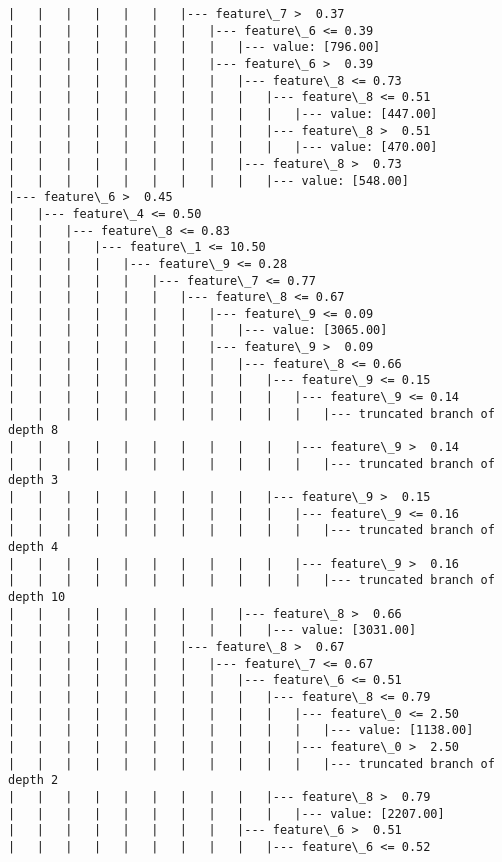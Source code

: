 \documentclass[11pt]{article}
\begin{document}
\begin{Verbatim}[commandchars=\\\{\}]
|   |   |   |   |   |   |--- feature\_7 >  0.37
|   |   |   |   |   |   |   |--- feature\_6 <= 0.39
|   |   |   |   |   |   |   |   |--- value: [796.00]
|   |   |   |   |   |   |   |--- feature\_6 >  0.39
|   |   |   |   |   |   |   |   |--- feature\_8 <= 0.73
|   |   |   |   |   |   |   |   |   |--- feature\_8 <= 0.51
|   |   |   |   |   |   |   |   |   |   |--- value: [447.00]
|   |   |   |   |   |   |   |   |   |--- feature\_8 >  0.51
|   |   |   |   |   |   |   |   |   |   |--- value: [470.00]
|   |   |   |   |   |   |   |   |--- feature\_8 >  0.73
|   |   |   |   |   |   |   |   |   |--- value: [548.00]
|--- feature\_6 >  0.45
|   |--- feature\_4 <= 0.50
|   |   |--- feature\_8 <= 0.83
|   |   |   |--- feature\_1 <= 10.50
|   |   |   |   |--- feature\_9 <= 0.28
|   |   |   |   |   |--- feature\_7 <= 0.77
|   |   |   |   |   |   |--- feature\_8 <= 0.67
|   |   |   |   |   |   |   |--- feature\_9 <= 0.09
|   |   |   |   |   |   |   |   |--- value: [3065.00]
|   |   |   |   |   |   |   |--- feature\_9 >  0.09
|   |   |   |   |   |   |   |   |--- feature\_8 <= 0.66
|   |   |   |   |   |   |   |   |   |--- feature\_9 <= 0.15
|   |   |   |   |   |   |   |   |   |   |--- feature\_9 <= 0.14
|   |   |   |   |   |   |   |   |   |   |   |--- truncated branch of depth 8
|   |   |   |   |   |   |   |   |   |   |--- feature\_9 >  0.14
|   |   |   |   |   |   |   |   |   |   |   |--- truncated branch of depth 3
|   |   |   |   |   |   |   |   |   |--- feature\_9 >  0.15
|   |   |   |   |   |   |   |   |   |   |--- feature\_9 <= 0.16
|   |   |   |   |   |   |   |   |   |   |   |--- truncated branch of depth 4
|   |   |   |   |   |   |   |   |   |   |--- feature\_9 >  0.16
|   |   |   |   |   |   |   |   |   |   |   |--- truncated branch of depth 10
|   |   |   |   |   |   |   |   |--- feature\_8 >  0.66
|   |   |   |   |   |   |   |   |   |--- value: [3031.00]
|   |   |   |   |   |   |--- feature\_8 >  0.67
|   |   |   |   |   |   |   |--- feature\_7 <= 0.67
|   |   |   |   |   |   |   |   |--- feature\_6 <= 0.51
|   |   |   |   |   |   |   |   |   |--- feature\_8 <= 0.79
|   |   |   |   |   |   |   |   |   |   |--- feature\_0 <= 2.50
|   |   |   |   |   |   |   |   |   |   |   |--- value: [1138.00]
|   |   |   |   |   |   |   |   |   |   |--- feature\_0 >  2.50
|   |   |   |   |   |   |   |   |   |   |   |--- truncated branch of depth 2
|   |   |   |   |   |   |   |   |   |--- feature\_8 >  0.79
|   |   |   |   |   |   |   |   |   |   |--- value: [2207.00]
|   |   |   |   |   |   |   |   |--- feature\_6 >  0.51
|   |   |   |   |   |   |   |   |   |--- feature\_6 <= 0.52

\end{Verbatim}
\end{document}
